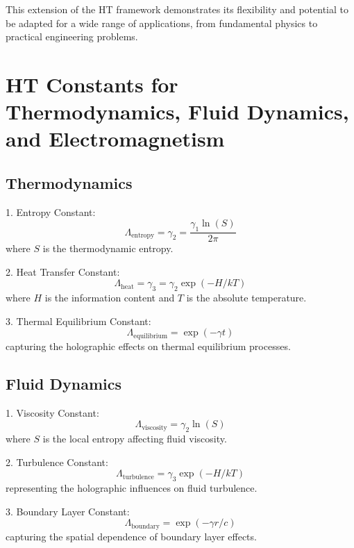 \documentclass{article}
\theoremstyle{plain}
\theoremstyle{definition}
\theoremstyle{remark}
\begin{document}
This extension of the HT framework demonstrates its flexibility and potential to be adapted for a wide range of applications, from fundamental physics to practical engineering problems.

\section*{HT Constants for Thermodynamics, Fluid Dynamics, and Electromagnetism}

\subsection*{Thermodynamics}

1. Entropy Constant:
   \begin{equation}
   \Lambda_\text{entropy} = \gamma_2 = \frac{\gamma_1\ln(S)}{2\pi}
   \end{equation}
   where $S$ is the thermodynamic entropy.

2. Heat Transfer Constant: 
   \begin{equation}
   \Lambda_\text{heat} = \gamma_3 = \gamma_2\exp(-H/kT)
   \end{equation}
   where $H$ is the information content and $T$ is the absolute temperature.

3. Thermal Equilibrium Constant:
   \begin{equation}
   \Lambda_\text{equilibrium} = \exp(-\gamma t)
   \end{equation}
   capturing the holographic effects on thermal equilibrium processes.

\subsection*{Fluid Dynamics}

1. Viscosity Constant:
   \begin{equation}
   \Lambda_\text{viscosity} = \gamma_2\ln(S)
   \end{equation}
   where $S$ is the local entropy affecting fluid viscosity.

2. Turbulence Constant:
   \begin{equation}
   \Lambda_\text{turbulence} = \gamma_3\exp(-H/kT)
   \end{equation}
   representing the holographic influences on fluid turbulence.

3. Boundary Layer Constant:
   \begin{equation}
   \Lambda_\text{boundary} = \exp(-\gamma r/c)
   \end{equation}
   capturing the spatial dependence of boundary layer effects.
\end{document}
